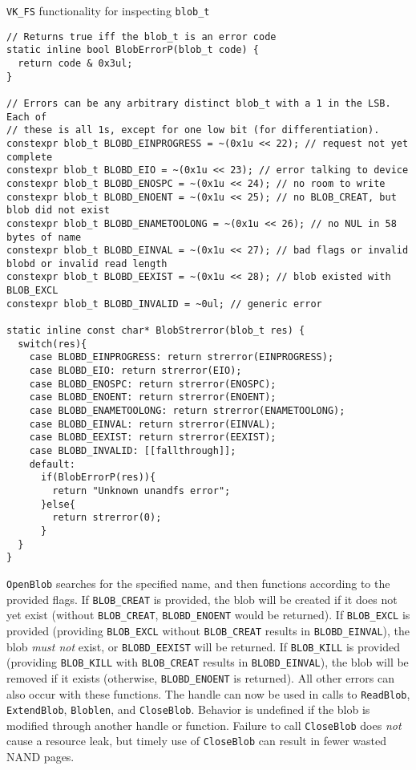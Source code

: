 \documentclass[letterpaper,10pt]{article}
\begin{document}
\begin{listing}[ht]
\caption{{\texttt{VK\_FS}} functionality for inspecting {\texttt{blob\_t}}}
\begin{verbatim}
// Returns true iff the blob_t is an error code
static inline bool BlobErrorP(blob_t code) {
  return code & 0x3ul;
}

// Errors can be any arbitrary distinct blob_t with a 1 in the LSB. Each of
// these is all 1s, except for one low bit (for differentiation).
constexpr blob_t BLOBD_EINPROGRESS = ~(0x1u << 22); // request not yet complete
constexpr blob_t BLOBD_EIO = ~(0x1u << 23); // error talking to device
constexpr blob_t BLOBD_ENOSPC = ~(0x1u << 24); // no room to write
constexpr blob_t BLOBD_ENOENT = ~(0x1u << 25); // no BLOB_CREAT, but blob did not exist
constexpr blob_t BLOBD_ENAMETOOLONG = ~(0x1u << 26); // no NUL in 58 bytes of name
constexpr blob_t BLOBD_EINVAL = ~(0x1u << 27); // bad flags or invalid blobd or invalid read length
constexpr blob_t BLOBD_EEXIST = ~(0x1u << 28); // blob existed with BLOB_EXCL
constexpr blob_t BLOBD_INVALID = ~0ul; // generic error

static inline const char* BlobStrerror(blob_t res) {
  switch(res){
    case BLOBD_EINPROGRESS: return strerror(EINPROGRESS);
    case BLOBD_EIO: return strerror(EIO);
    case BLOBD_ENOSPC: return strerror(ENOSPC);
    case BLOBD_ENOENT: return strerror(ENOENT);
    case BLOBD_ENAMETOOLONG: return strerror(ENAMETOOLONG);
    case BLOBD_EINVAL: return strerror(EINVAL);
    case BLOBD_EEXIST: return strerror(EEXIST);
    case BLOBD_INVALID: [[fallthrough]];
    default:
      if(BlobErrorP(res)){
        return "Unknown unandfs error";
      }else{
        return strerror(0);
      }
  }
}
\end{verbatim}
\end{listing}

{\texttt{OpenBlob}} searches for the specified name, and then functions according
to the provided flags. If {\texttt{BLOB\_CREAT}} is provided, the blob will be
created if it does not yet exist (without \texttt{BLOB\_CREAT}, {\texttt{BLOBD\_ENOENT}} would
be returned). If {\texttt{BLOB\_EXCL}} is provided (providing {\texttt{BLOB\_EXCL}}
without {\texttt{BLOB\_CREAT}} results in {\texttt{BLOBD\_EINVAL}}), the
blob \textit{must not} exist, or \texttt{BLOBD\_EEXIST} will be returned. If
\texttt{BLOB\_KILL} is provided (providing \texttt{BLOB\_KILL} with \texttt{BLOB\_CREAT}
results in \texttt{BLOBD\_EINVAL}), the blob will be removed if it exists (otherwise,
\texttt{BLOBD\_ENOENT} is returned). All other errors can also occur with these
functions. The handle can now be used in calls to \texttt{ReadBlob}, \texttt{ExtendBlob},
\texttt{Bloblen}, and \texttt{CloseBlob}. Behavior is undefined if the blob
is modified through another handle or function. Failure to call \texttt{CloseBlob}
does \textit{not} cause a resource leak, but timely use of \texttt{CloseBlob}
can result in fewer wasted NAND pages.
\end{document}
